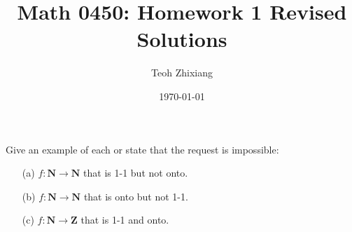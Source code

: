 \documentclass{article}
\begin{document}
\title{Math 0450: Homework 1 Revised Solutions}
\date{\today}
\author{Teoh Zhixiang}

\maketitle

\begin{Prob}[Ex. 1.2.8] Give an example of each or state that the request is impossible:
\begin{enumerate}
\item[(a)] $f:\mathbf{N}\to \mathbf{N}$ that is 1-1 but not onto.
\item[(b)]  $f:\mathbf{N}\to \mathbf{N}$ that is  onto but not 1-1.
\item[(c)] $f:\mathbf{N}\to \mathbf{Z}$ that is 1-1 and onto.
\end{enumerate}
\end{Prob}
\end{document}
